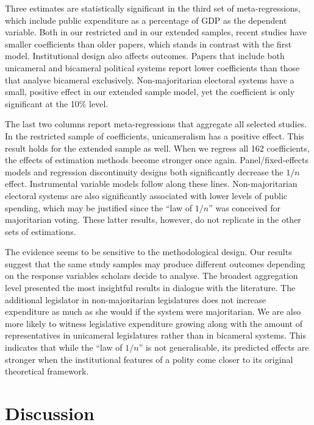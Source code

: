 \documentclass[11pt,a4paper,]{article}
\begin{document}
Three estimates are statistically significant in the third set of
meta-regressions, which include public expenditure as a percentage of
GDP as the dependent variable. Both in our restricted and in our
extended samples, recent studies have smaller coefficients than older
papers, which stands in contrast with the first model. Institutional
design also affects outcomes. Papers that include both unicameral and
bicameral political systems report lower coefficients than those that
analyse bicameral exclusively. Non-majoritarian electoral systems have a
small, positive effect in our extended sample model, yet the coefficient
is only significant at the 10\% level.

The last two columns report meta-regressions that aggregate all selected
studies. In the restricted sample of coefficients, unicameralism has a
positive effect. This result holds for the extended sample as well. When
we regress all 162 coefficients, the effects of estimation methods
become stronger once again. Panel/fixed-effects models and regression
discontinuity designs both significantly decrease the \(1/n\) effect.
Instrumental variable models follow along these lines. Non-majoritarian
electoral systems are also significantly associated with lower levels of
public spending, which may be justified since the ``law of \(1/n\)'' was
conceived for majoritarian voting. These latter results, however, do not
replicate in the other sets of estimations.

The evidence seems to be sensitive to the methodological design. Our
results suggest that the same study samples may produce different
outcomes depending on the response variables scholars decide to analyse.
The broadest aggregation level presented the most insightful results in
dialogue with the literature. The additional legislator in
non-majoritarian legislatures does not increase expenditure as much as
she would if the system were majoritarian. We are also more likely to
witness legislative expenditure growing along with the amount of
representatives in unicameral legislatures rather than in bicameral
systems. This indicates that while the ``law of \(1/n\)'' is not
generalisable, its predicted effects are stronger when the institutional
features of a polity come closer to its original theoretical framework.

\hypertarget{discussion}{%
\section{Discussion}\label{discussion}}
\end{document}
